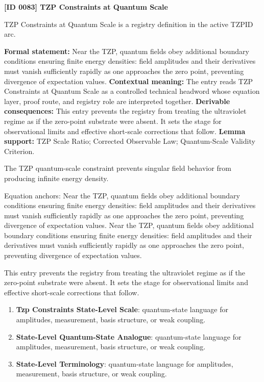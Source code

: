 \clearpage
\noindent\textbf{[ID 0083] TZP Constraints at Quantum Scale}\par
\vspace{0.35em}
\begingroup\small
{}
TZP Constraints at Quantum Scale is a registry definition in the active TZPID arc.

\begingroup\footnotesize\setlength{\emergencystretch}{3em}\sloppy
\textbf{Formal statement:} Near the TZP, quantum fields obey additional boundary conditions ensuring finite energy densities: field amplitudes and their derivatives must vanish sufficiently rapidly as one approaches the zero point, preventing divergence of expectation values. \textbf{Contextual meaning:} The entry reads TZP Constraints at Quantum Scale as a controlled technical headword whose equation layer, proof route, and registry role are interpreted together. \textbf{Derivable consequences:} This entry prevents the registry from treating the ultraviolet regime as if the zero-point substrate were absent. It sets the stage for observational limits and effective short-scale corrections that follow. \textbf{Lemma support:} TZP Scale Ratio; Corrected Observable Law; Quantum-Scale Validity Criterion.\par
\endgroup

The TZP quantum-scale constraint prevents singular field behavior from producing infinite energy density.

Equation anchors: Near the TZP, quantum fields obey additional boundary conditions ensuring finite energy densities: field amplitudes and their derivatives must vanish sufficiently rapidly as one approaches the zero point, preventing divergence of expectation values. Near the TZP, quantum fields obey additional boundary conditions ensuring finite energy densities: field amplitudes and their derivatives must vanish sufficiently rapidly as one approaches the zero point, preventing divergence of expectation values.

This entry prevents the registry from treating the ultraviolet regime as if the zero-point substrate were absent. It sets the stage for observational limits and effective short-scale corrections that follow.
\endgroup

\begingroup\footnotesize\sloppy
\begin{enumerate}[leftmargin=1.35em,itemsep=1pt,topsep=1pt,parsep=0pt]
\item \textbf{Tzp Constraints State-Level Scale}: quantum-state language for amplitudes, measurement, basis structure, or weak coupling.
\item \textbf{State-Level Quantum-State Analogue}: quantum-state language for amplitudes, measurement, basis structure, or weak coupling.
\item \textbf{State-Level Terminology}: quantum-state language for amplitudes, measurement, basis structure, or weak coupling.
\end{enumerate}
\endgroup

